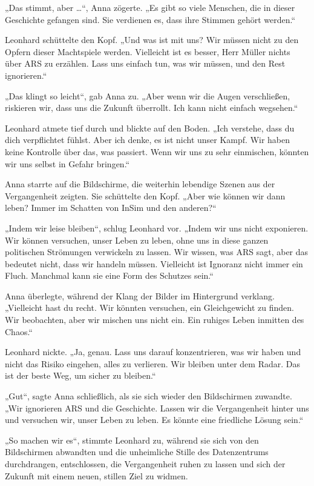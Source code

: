 \documentclass[
]{article}
\begin{document}
„Das stimmt, aber \ldots``, Anna zögerte. „Es gibt so viele Menschen,
die in dieser Geschichte gefangen sind. Sie verdienen es, dass ihre
Stimmen gehört werden.``

Leonhard schüttelte den Kopf. „Und was ist mit uns? Wir müssen nicht zu
den Opfern dieser Machtspiele werden. Vielleicht ist es besser, Herr
Müller nichts über ARS zu erzählen. Lass uns einfach tun, was wir
müssen, und den Rest ignorieren.``

„Das klingt so leicht``, gab Anna zu. „Aber wenn wir die Augen
verschließen, riskieren wir, dass uns die Zukunft überrollt. Ich kann
nicht einfach wegsehen.``

Leonhard atmete tief durch und blickte auf den Boden. „Ich verstehe,
dass du dich verpflichtet fühlst. Aber ich denke, es ist nicht unser
Kampf. Wir haben keine Kontrolle über das, was passiert. Wenn wir uns zu
sehr einmischen, könnten wir uns selbst in Gefahr bringen.``

Anna starrte auf die Bildschirme, die weiterhin lebendige Szenen aus der
Vergangenheit zeigten. Sie schüttelte den Kopf. „Aber wie können wir
dann leben? Immer im Schatten von InSim und den anderen?{\kern0pt}``

„Indem wir leise bleiben``, schlug Leonhard vor. „Indem wir uns nicht
exponieren. Wir können versuchen, unser Leben zu leben, ohne uns in
diese ganzen politischen Strömungen verwickeln zu lassen. Wir wissen,
was ARS sagt, aber das bedeutet nicht, dass wir handeln müssen.
Vielleicht ist Ignoranz nicht immer ein Fluch. Manchmal kann sie eine
Form des Schutzes sein.``

Anna überlegte, während der Klang der Bilder im Hintergrund verklang.
„Vielleicht hast du recht. Wir könnten versuchen, ein Gleichgewicht zu
finden. Wir beobachten, aber wir mischen uns nicht ein. Ein ruhiges
Leben inmitten des Chaos.``

Leonhard nickte. „Ja, genau. Lass uns darauf konzentrieren, was wir
haben und nicht das Risiko eingehen, alles zu verlieren. Wir bleiben
unter dem Radar. Das ist der beste Weg, um sicher zu bleiben.``

„Gut``, sagte Anna schließlich, als sie sich wieder den Bildschirmen
zuwandte. „Wir ignorieren ARS und die Geschichte. Lassen wir die
Vergangenheit hinter uns und versuchen wir, unser Leben zu leben. Es
könnte eine friedliche Lösung sein.``

„So machen wir es``, stimmte Leonhard zu, während sie sich von den
Bildschirmen abwandten und die unheimliche Stille des Datenzentrums
durchdrangen, entschlossen, die Vergangenheit ruhen zu lassen und sich
der Zukunft mit einem neuen, stillen Ziel zu widmen.
\end{document}
